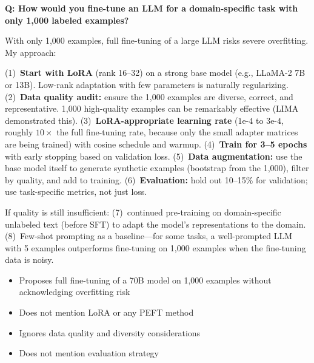 \begin{interviewq}
\textbf{Q: How would you fine-tune an LLM for a domain-specific task with only
1,000 labeled examples?}

 \quad {} \quad \badgefreq{\freqhigh}

\stronganswer
With only 1,000 examples, full fine-tuning of a large LLM risks severe overfitting.
My approach:

(1)~\textbf{Start with LoRA} (rank 16--32) on a strong base model (e.g., LLaMA-2 7B
or 13B).  Low-rank adaptation with few parameters is naturally regularizing.
(2)~\textbf{Data quality audit:} ensure the 1,000 examples are diverse, correct,
and representative.  1,000 high-quality examples can be remarkably effective (LIMA
demonstrated this).
(3)~\textbf{LoRA-appropriate learning rate} ($1\text{e-}4$ to $3\text{e-}4$,
roughly $10\times$ the full fine-tuning rate, because only the small adapter
matrices are being trained) with cosine schedule and warmup.
(4)~\textbf{Train for 3--5 epochs} with early stopping based on validation loss.
(5)~\textbf{Data augmentation:} use the base model itself to generate synthetic
examples (bootstrap from the 1,000), filter by quality, and add to training.
(6)~\textbf{Evaluation:} hold out 10--15\% for validation; use task-specific
metrics, not just loss.

If quality is still insufficient: (7)~continued pre-training on domain-specific
unlabeled text (before SFT) to adapt the model's representations to the domain.
(8)~Few-shot prompting as a baseline---for some tasks, a well-prompted LLM with
5 examples outperforms fine-tuning on 1,000 examples when the fine-tuning data
is noisy.

\redflags
\begin{itemize}
    \item Proposes full fine-tuning of a 70B model on 1,000 examples without
          acknowledging overfitting risk
    \item Does not mention LoRA or any PEFT method
    \item Ignores data quality and diversity considerations
    \item Does not mention evaluation strategy
\end{itemize}



\end{interviewq}
